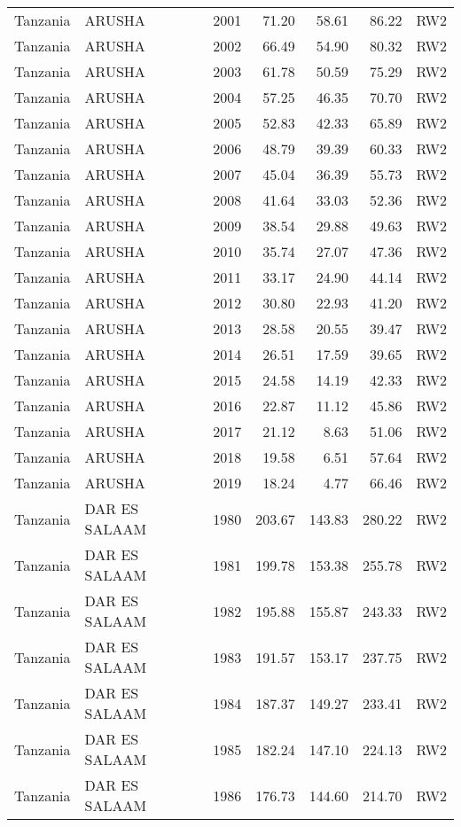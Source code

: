 \begin{longtable}{lllrrrl}
  Tanzania & ARUSHA & 2001 & 71.20 & 58.61 & 86.22 & RW2 \\ 
  Tanzania & ARUSHA & 2002 & 66.49 & 54.90 & 80.32 & RW2 \\ 
  Tanzania & ARUSHA & 2003 & 61.78 & 50.59 & 75.29 & RW2 \\ 
  Tanzania & ARUSHA & 2004 & 57.25 & 46.35 & 70.70 & RW2 \\ 
  Tanzania & ARUSHA & 2005 & 52.83 & 42.33 & 65.89 & RW2 \\ 
  Tanzania & ARUSHA & 2006 & 48.79 & 39.39 & 60.33 & RW2 \\ 
  Tanzania & ARUSHA & 2007 & 45.04 & 36.39 & 55.73 & RW2 \\ 
  Tanzania & ARUSHA & 2008 & 41.64 & 33.03 & 52.36 & RW2 \\ 
  Tanzania & ARUSHA & 2009 & 38.54 & 29.88 & 49.63 & RW2 \\ 
  Tanzania & ARUSHA & 2010 & 35.74 & 27.07 & 47.36 & RW2 \\ 
  Tanzania & ARUSHA & 2011 & 33.17 & 24.90 & 44.14 & RW2 \\ 
  Tanzania & ARUSHA & 2012 & 30.80 & 22.93 & 41.20 & RW2 \\ 
  Tanzania & ARUSHA & 2013 & 28.58 & 20.55 & 39.47 & RW2 \\ 
  Tanzania & ARUSHA & 2014 & 26.51 & 17.59 & 39.65 & RW2 \\ 
  Tanzania & ARUSHA & 2015 & 24.58 & 14.19 & 42.33 & RW2 \\ 
  Tanzania & ARUSHA & 2016 & 22.87 & 11.12 & 45.86 & RW2 \\ 
  Tanzania & ARUSHA & 2017 & 21.12 & 8.63 & 51.06 & RW2 \\ 
  Tanzania & ARUSHA & 2018 & 19.58 & 6.51 & 57.64 & RW2 \\ 
  Tanzania & ARUSHA & 2019 & 18.24 & 4.77 & 66.46 & RW2 \\ 
  Tanzania & DAR ES SALAAM & 1980 & 203.67 & 143.83 & 280.22 & RW2 \\ 
  Tanzania & DAR ES SALAAM & 1981 & 199.78 & 153.38 & 255.78 & RW2 \\ 
  Tanzania & DAR ES SALAAM & 1982 & 195.88 & 155.87 & 243.33 & RW2 \\ 
  Tanzania & DAR ES SALAAM & 1983 & 191.57 & 153.17 & 237.75 & RW2 \\ 
  Tanzania & DAR ES SALAAM & 1984 & 187.37 & 149.27 & 233.41 & RW2 \\ 
  Tanzania & DAR ES SALAAM & 1985 & 182.24 & 147.10 & 224.13 & RW2 \\ 
  Tanzania & DAR ES SALAAM & 1986 & 176.73 & 144.60 & 214.70 & RW2 \\ 

\end{longtable}
